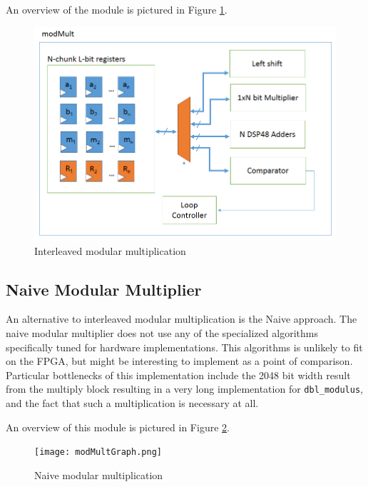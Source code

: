 \documentclass[12pt]{article}
\begin{document}
An overview of the module is pictured in Figure \ref{fig-inter}.

\begin{figure}
  \begin{centering}
    \includegraphics[width=\textwidth]{modmult.png}
    \caption{Interleaved modular multiplication}
    \label{fig-inter}
  \end{centering}
\end{figure}

\subsection{Naive Modular Multiplier}
An alternative to interleaved modular multiplication is the Naive approach.
The naive modular multiplier does not use any of the specialized algorithms
specifically tuned for hardware implementations.
This algorithms is unlikely to fit on the FPGA,
but might be interesting to implement as a point of comparison.
Particular bottlenecks of this implementation include the 2048 bit width result from the multiply block
resulting in a very long implementation for {\tt dbl\_modulus},
and the fact that such a multiplication is necessary at all.

An overview of this module is pictured in Figure \ref{fig-naive}.

\begin{figure}
  \begin{centering}
    \texttt{[image: modMultGraph.png]}
    \caption{Naive modular multiplication}
    \label{fig-naive}
  \end{centering}
\end{figure}
\end{document}
